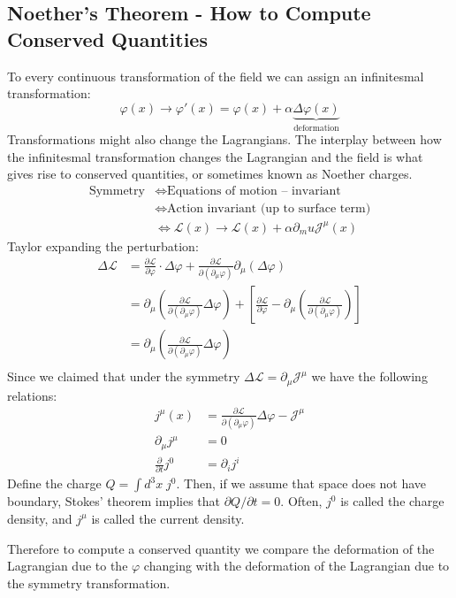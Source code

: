 \documentclass{report}
\theoremstyle{plain}
\theoremstyle{definition}
\theoremstyle{remark}
\newcommand{\FR}[2]{\frac{#1}{#2}}
\newcommand{\mc}{\mathcal}
\newcommand{\vphi}{\varphi}
\newcommand{\di}{\partial}
\newcommand{\ddi}[2]{\FR{\partial {#1}}{\partial {#2}}}
\begin{document}
\subsection{Noether's Theorem - How to Compute Conserved Quantities}
To every continuous transformation of the field we can assign an infinitesmal
transformation:
\[ \vphi(x) \rightarrow \vphi'(x) = \vphi(x) +
\alpha\underbrace{\Delta\vphi(x)}_{\text{deformation}}\]
Transformations might also change the Lagrangians. The interplay between
how the infinitesmal transformation changes the Lagrangian and the field is
what gives rise to conserved quantities, or sometimes known as Noether charges.
\begin{align*}
    \text{Symmetry} &\iff \text{Equations of motion -- invariant}\\
    &\iff \text{Action invariant (up to surface term)}\\
    &\iff \mc L(x) \rightarrow \mc L(x) + \alpha\di_mu \mc J^\mu(x)
\end{align*}
Taylor expanding the perturbation:
\begin{align*}
    \Delta \mc L &= \ddi{\mc L}{\vphi} \cdot \Delta \vphi + \ddi{\mc
    L}{(\di_\mu\vphi)}\di_\mu(\Delta\vphi)\\
    &= \di_\mu\left( \ddi{\mc L}{(\di_\mu\vphi)}\Delta\vphi \right) +
    \left[ \ddi{\mc L}{\vphi} - \di_\mu \left( \ddi{\mc L}{(\di_\mu \vphi)}
    \right) \right]\\
    &= \di_\mu\left( \ddi{\mc L}{(\di_\mu\vphi)}\Delta\vphi \right)\\
\end{align*}
Since we claimed that under the symmetry $\Delta\mc L = \di_\mu \mc J^\mu$
we have the following relations:
\begin{align*}
    j^\mu(x) &= \ddi{\mc L}{(\di_\mu\vphi)}\Delta\vphi - \mc J^\mu\\
    \di_\mu j^\mu &= 0\\
    \ddi{}{t} j^0 &= \di_i j^i
\end{align*}
Define the charge $Q = \int d^3x\; j^0$. Then, if we assume that space does
not have boundary, Stokes' theorem implies that $\di Q/\di t = 0$. Often,
$j^0$ is called the charge density, and $j^\mu$ is called the current
density.

\begin{mdframed}
Therefore to compute a conserved quantity we compare the deformation of the
Lagrangian due to the $\vphi$ changing with the deformation of the
Lagrangian due to the symmetry transformation. 
\end{mdframed}
\end{document}
